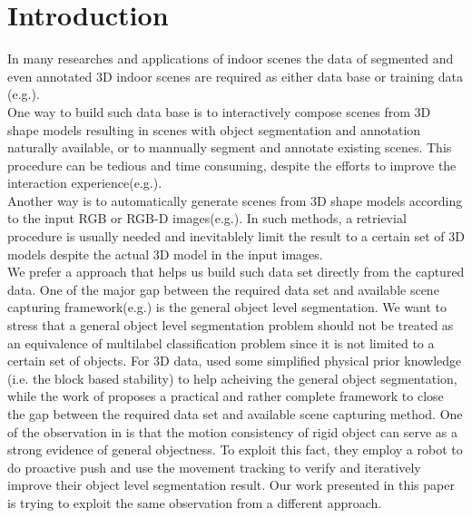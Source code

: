 \section{Introduction}
\label{sec:intro}
In many researches and applications of indoor scenes the data of segmented and even annotated 3D indoor scenes are required as either data base or training data (e.g.\cite{SceneFromExample}\cite{Fisher:2012:ESO:2366145.2366154}\cite{Chen:2014:ASM:2661229.2661239}\cite{Fisher:ActivityCentricSceneSynthesis}).\\
One way to build such data base is to interactively compose scenes from 3D shape models resulting in scenes with object segmentation and annotation naturally available, or to mannually segment and annotate existing scenes. This procedure can be tedious and time consuming, despite the efforts to improve the interaction experience(e.g.\cite{Merrell:2011:IFL:2010324.1964982}\cite{Xu:2013:SSC:2461912.2461968}).\\
Another way is to automatically generate scenes from 3D shape models according to the input RGB or RGB-D images(e.g.\cite{Liu2015Model}\cite{Chen:2014:ASM:2661229.2661239}). In such methods, a retrievial procedure is usually needed and inevitablely limit the result to a certain set of 3D models despite the actual 3D model in the input images.\\
We prefer a approach that helps us build such data set directly from the captured data. One of the major gap between the required data set and available scene capturing framework(e.g.\cite{KinectFusion}) is the general object level segmentation. We want to stress that a general object level segmentation problem should not be treated as an equivalence of multilabel classification problem since it is not limited to a certain set of objects. For 3D data, \cite{3DReasoningfromBlockstoStability} used some simplified physical prior knowledge (i.e. the block based stability) to help acheiving the general object segmentation, while the work of \cite{Xu:2015:ACS:2816795.2818075} proposes a practical and rather complete framework to close the gap between the required data set and available scene capturing method. One of the observation in \cite{Xu:2015:ACS:2816795.2818075} is that the motion consistency of rigid object can serve as a strong evidence of general objectness. To exploit this fact, they employ a robot to do proactive push and use the movement tracking to verify and iteratively improve their object level segmentation result. Our work presented in this paper is trying to exploit the same observation from a different approach.\\
